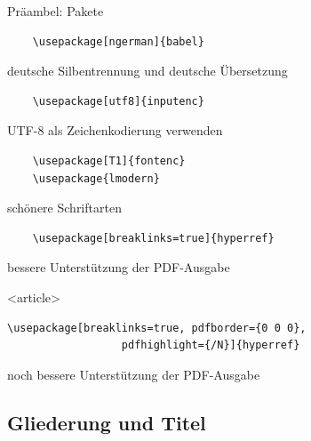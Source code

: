 \begin{Frame}[fragile]{Präambel: Pakete}
  \begin{lstlisting}
    \usepackage[ngerman]{babel}
  \end{lstlisting}
  deutsche Silbentrennung und deutsche Übersetzung
  \begin{lstlisting}
    \usepackage[utf8]{inputenc}
  \end{lstlisting}
  UTF-8 als Zeichenkodierung verwenden
  \begin{lstlisting}
    \usepackage[T1]{fontenc}
    \usepackage{lmodern}
  \end{lstlisting}
  schönere Schriftarten
  \begin{lstlisting}
    \usepackage[breaklinks=true]{hyperref}
  \end{lstlisting}
  bessere Unterstützung der PDF-Ausgabe
  \begin{onlyenv}<article>
    \begin{lstlisting}[gobble=6]
      \usepackage[breaklinks=true, pdfborder={0 0 0},
                  pdfhighlight={/N}]{hyperref}
    \end{lstlisting}
    noch bessere Unterstützung der PDF-Ausgabe
  \end{onlyenv}
\end{Frame}

\subsection{Gliederung und Titel}

